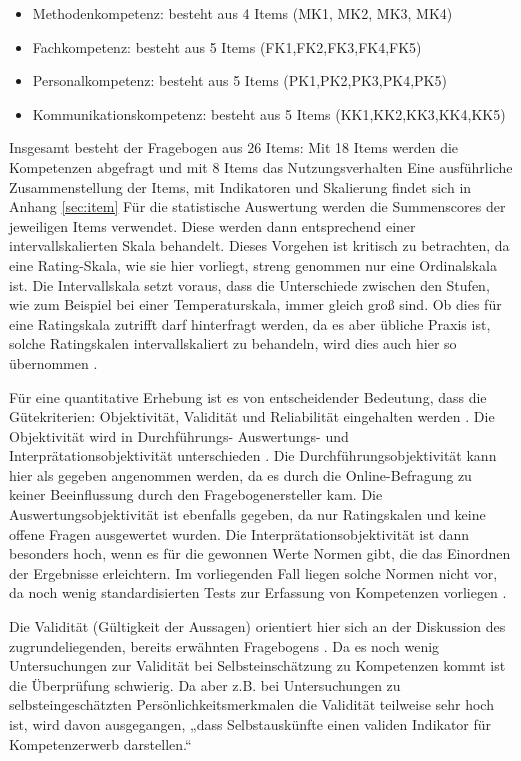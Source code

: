 \documentclass[12pt, bibliography=totoc]{scrartcl}
\begin{document}
\begin{itemize}
\tightlist
\item
  Methodenkompetenz: besteht aus 4 Items (MK1, MK2, MK3, MK4)
\item
  Fachkompetenz: besteht aus 5 Items (FK1,FK2,FK3,FK4,FK5)
\item
  Personalkompetenz: besteht aus 5 Items (PK1,PK2,PK3,PK4,PK5)
\item
  Kommunikationskompetenz: besteht aus 5 Items (KK1,KK2,KK3,KK4,KK5)
\end{itemize}

Insgesamt besteht der Fragebogen aus 26 Items: Mit 18 Items werden die
Kompetenzen abgefragt und mit 8 Items das Nutzungsverhalten Eine
ausführliche Zusammenstellung der Items, mit Indikatoren und Skalierung
findet sich in Anhang \ref{sec:item} Für die statistische Auswertung
werden die Summenscores der jeweiligen Items verwendet. Diese werden
dann entsprechend einer intervallskalierten Skala behandelt. Dieses
Vorgehen ist kritisch zu betrachten, da eine Rating-Skala, wie sie hier
vorliegt, streng genommen nur eine Ordinalskala ist. Die Intervallskala
setzt voraus, dass die Unterschiede zwischen den Stufen, wie zum
Beispiel bei einer Temperaturskala, immer gleich groß sind. Ob dies für
eine Ratingskala zutrifft darf hinterfragt werden, da es aber übliche
Praxis ist, solche Ratingskalen intervallskaliert zu behandeln, wird
dies auch hier so übernommen \parencite[65]{Sedlmeier2013}.

Für eine quantitative Erhebung ist es von entscheidender Bedeutung, dass
die Gütekriterien: Objektivität, Validität und Reliabilität eingehalten
werden \parencite[104]{Hader2015}. Die Objektivität wird in
Durchführungs- Auswertungs- und Interprätationsobjektivität
unterschieden \parencite[70]{Sedlmeier2013}. Die
Durchführungsobjektivität kann hier als gegeben angenommen werden, da es
durch die Online-Befragung zu keiner Beeinflussung durch den
Fragebogenersteller kam. Die Auswertungsobjektivität ist ebenfalls
gegeben, da nur Ratingskalen und keine offene Fragen ausgewertet wurden.
Die Interprätationsobjektivität ist dann besonders hoch, wenn es für die
gewonnen Werte Normen gibt, die das Einordnen der Ergebnisse
erleichtern. Im vorliegenden Fall liegen solche Normen nicht vor, da
noch wenig standardisierten Tests zur Erfassung von Kompetenzen
vorliegen \parencite{Braun2008}.

Die Validität (Gültigkeit der Aussagen) orientiert hier sich an der
Diskussion des zugrundeliegenden, bereits erwähnten Fragebogens
\parencite{Braun2008}. Da es noch wenig Untersuchungen zur Validität bei
Selbsteinschätzung zu Kompetenzen kommt ist die Überprüfung schwierig.
Da aber z.B. bei Untersuchungen zu selbsteingeschätzten
Persönlichkeitsmerkmalen die Validität teilweise sehr hoch ist, wird
davon ausgegangen, „dass Selbstauskünfte einen validen Indikator für
Kompetenzerwerb darstellen.`` \parencite[32]{Braun2008}
\end{document}
